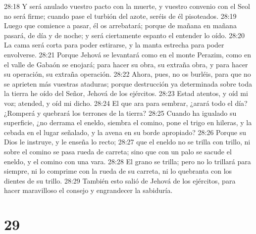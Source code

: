 28:18 Y será anulado vuestro pacto con la muerte, y vuestro convenio con el Seol no será firme; cuando pase el turbión del azote, seréis de él pisoteados.  
28:19 Luego que comience a pasar, él os arrebatará; porque de mañana en mañana pasará, de día y de noche; y será ciertamente espanto el entender lo oído.  
28:20 La cama será corta para poder estirarse, y la manta estrecha para poder envolverse.  
28:21 Porque Jehová se levantará como en el monte Perazim, como en el valle de Gabaón se enojará; para hacer su obra, su extraña obra, y para hacer su operación, su extraña operación.  
28:22 Ahora, pues, no os burléis, para que no se aprieten más vuestras ataduras; porque destrucción ya determinada sobre toda la tierra he oído del Señor, Jehová de los ejércitos.  
28:23 Estad atentos, y oíd mi voz; atended, y oíd mi dicho.  
28:24 El que ara para sembrar, ¿arará todo el día? ¿Romperá y quebrará los terrones de la tierra?  
28:25 Cuando ha igualado su superficie, ¿no derrama el eneldo, siembra el comino, pone el trigo en hileras, y la cebada en el lugar señalado, y la avena en su borde apropiado?  
28:26 Porque su Dios le instruye, y le enseña lo recto;  
28:27 que el eneldo no se trilla con trillo, ni sobre el comino se pasa rueda de carreta; sino que con un palo se sacude el eneldo, y el comino con una vara.  
28:28 El grano se trilla; pero no lo trillará para siempre, ni lo comprime con la rueda de su carreta, ni lo quebranta con los dientes de su trillo.  
28:29 También esto salió de Jehová de los ejércitos, para hacer maravilloso el consejo y engrandecer la sabiduría.  

\chapter{29}

